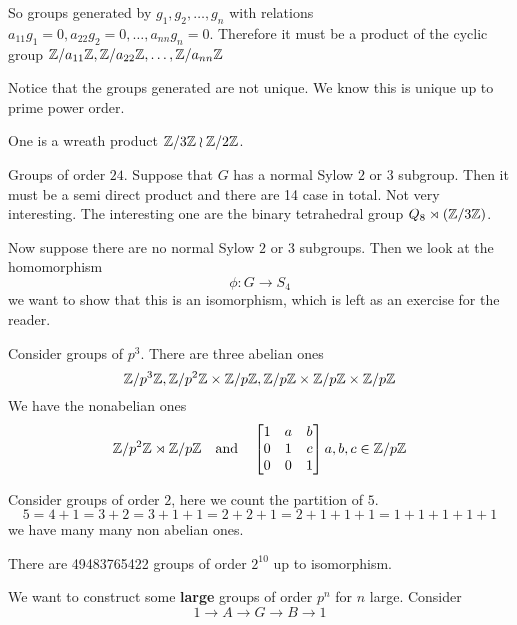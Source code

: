 So groups generated by $g_1, g_2, \ldots, g_n$ with relations $a_{11} g_1 = 0, a_{22} g_2 = 0, \ldots, a_{nn} g_n = 0$. Therefore it must be a product of the cyclic group $\mathbb Z/ a_{11} \mathbb Z, \mathbb Z/ a_{22} \mathbb Z, \ldots, \mathbb Z/ a_{nn} \mathbb Z $ 

Notice that the groups generated are not unique. We know this is unique up to prime power order.

One is a wreath product $\mathbb Z/ 3 \mathbb Z \wr \mathbb Z/ 2 \mathbb Z $.

\begin{example}
	Groups of order $24$. Suppose that $G$ has a normal Sylow $2$ or $3$ subgroup. Then it must be a semi direct product and there are 14 case in total. Not very interesting. The interesting one are the binary tetrahedral group $Q_8 \rtimes (\mathbb Z/ 3 \mathbb Z)$.

	Now suppose there are no normal Sylow $2$ or $3$ subgroups. Then we look at the homomorphism
	\[ \phi : G \to S_4\]
	we want to show that this is an isomorphism, which is left as an exercise for the reader.
\end{example}
\begin{example}
	Consider groups of $p^3$. There are three abelian ones
	\[ \mathbb Z/ p^3 \mathbb Z, \mathbb Z/ p^2 \mathbb Z \times \mathbb Z/ p \mathbb Z, \mathbb Z/ p \mathbb Z  \times \mathbb Z/ p \mathbb Z \times \mathbb Z/ p \mathbb Z   \]
	We have the nonabelian ones
	\[ \mathbb Z/ p^2 \mathbb Z \rtimes \mathbb Z/ p \mathbb Z \quad \mathrm{and} \quad \begin{bmatrix}
		1 & a & b \\
		0 & 1 & c \\
		0 & 0 & 1 \\
	\end{bmatrix} a,b,c \in \mathbb Z/ p \mathbb Z \]

\end{example}
\begin{example}
	Consider groups of order $2$, here we count the partition of $5$.
	\[ 5 = 4 + 1 = 3 + 2 =  3 + 1 + 1 = 2 + 2 + 1 = 2 + 1 + 1+ 1 = 1 + 1 + 1 + 1 + 1\]
	we have many many non abelian ones.
\end{example}
\begin{fact}
	There are 49483765422 groups of order $2^{10}$ up to isomorphism.
\end{fact}
\begin{example}
	We want to construct some \textbf{large} groups of order $p^n$ for $n$ large. Consider
	\[ 1 \to A \to G \to B \to 1\]
\end{example}